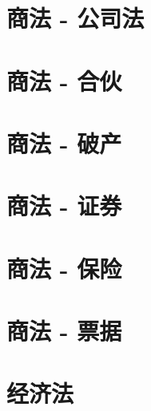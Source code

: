 

\maketitle
\tableofcontents

\chapter{商法 - 公司法}













\chapter{商法 - 合伙}





\chapter{商法 - 破产}








\chapter{商法 - 证券}



\chapter{商法 - 保险}






\chapter{商法 - 票据}







\chapter{经济法}


